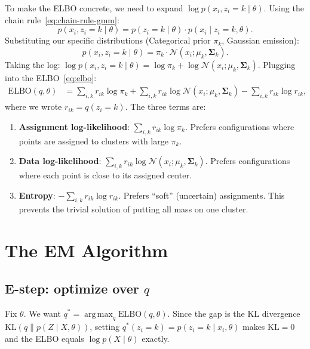 \documentclass[11pt]{article}
\theoremstyle{definition}
\theoremstyle{plain}
\theoremstyle{remark}
\newcommand{\Sv}{\boldsymbol{\Sigma}}
\newcommand{\KL}{\mathrm{KL}}
\DeclareMathOperator*{\argmax}{arg\,max}
\begin{document}
To make the ELBO concrete, we need to expand $\log p(x_i,z_i=k\mid\theta)$. Using the chain rule~\eqref{eq:chain-rule-gmm}:
\begin{equation}
  p(x_i,z_i=k\mid\theta) = p(z_i=k\mid\theta)\cdot p(x_i\mid z_i=k,\theta).
\end{equation}
Substituting our specific distributions (Categorical prior $\pi_k$, Gaussian emission):
\begin{equation}
  p(x_i,z_i=k\mid\theta) = \pi_k\cdot\mathcal{N}(x_i;\mu_k,\Sv_k).
\end{equation}
Taking the log: $\log p(x_i,z_i=k\mid\theta)=\log\pi_k+\log\mathcal{N}(x_i;\mu_k,\Sv_k)$. Plugging into the ELBO~\eqref{eq:elbo}:
\begin{align}
  \mathrm{ELBO}(q,\theta) &= \sum_{i,k} r_{ik}\log\pi_k + \sum_{i,k} r_{ik}\log\mathcal{N}(x_i;\mu_k,\Sv_k) - \sum_{i,k} r_{ik}\log r_{ik},
\end{align}
where we wrote $r_{ik}=q(z_i=k)$. The three terms are:
\begin{enumerate}[leftmargin=*,itemsep=2pt]
  \item \textbf{Assignment log-likelihood}: $\sum_{i,k} r_{ik}\log\pi_k$. Prefers configurations where points are assigned to clusters with large $\pi_k$.
  \item \textbf{Data log-likelihood}: $\sum_{i,k} r_{ik}\log\mathcal{N}(x_i;\mu_k,\Sv_k)$. Prefers configurations where each point is close to its assigned center.
  \item \textbf{Entropy}: $-\sum_{i,k} r_{ik}\log r_{ik}$. Prefers ``soft'' (uncertain) assignments. This prevents the trivial solution of putting all mass on one cluster.
\end{enumerate}

\section{The EM Algorithm}

\subsection{E-step: optimize over $q$}

Fix $\theta$. We want $q^*=\argmax_q \mathrm{ELBO}(q,\theta)$. Since the gap is the KL divergence $\KL(q\|p(Z\mid X,\theta))$, setting $q^*(z_i=k)=p(z_i=k\mid x_i,\theta)$ makes $\KL=0$ and the ELBO equals $\log p(X\mid\theta)$ exactly.
\end{document}
